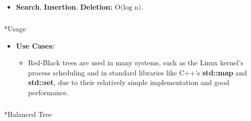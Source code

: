\documentclass[
  letterpaper,
  DIV=11,
  numbers=noendperiod]{scrreprt}
\makeatletter
\let\oldsubparagraph\subparagraph
\renewcommand{\subparagraph}{
    \@ifstar
      \xxxSubParagraphStar
      \xxxSubParagraphNoStar
  }
\newcommand{\xxxSubParagraphStar}[1]{\oldsubparagraph*{#1}\mbox{}}
\newcommand{\xxxSubParagraphNoStar}[1]{\oldsubparagraph{#1}\mbox{}}
\providecommand{\tightlist}{%
  \setlength{\itemsep}{0pt}\setlength{\parskip}{0pt}}
\makeatother
\begin{document}
\begin{tcolorbox}[enhanced jigsaw, colframe=quarto-callout-note-color-frame, toprule=.15mm, bottomrule=.15mm, rightrule=.15mm, colback=white, breakable, arc=.35mm, opacityback=0, left=2mm, leftrule=.75mm]
\begin{itemize}
  \begin{itemize}
  \tightlist
  \item
    \textbf{Search}, \textbf{Insertion}, \textbf{Deletion:}
    \(\text{O(log n)}\).
  \end{itemize}
\end{itemize}

\subparagraph*{Usage}\label{usage-25}

\begin{itemize}
\item
  \textbf{Use Cases:}

  \begin{itemize}
  \tightlist
  \item
    Red-Black trees are used in many systems, such as the Linux kernel's
    process scheduling and in standard libraries like C++'s
    \textbf{std::map} and \textbf{std::set}, due to their relatively
    simple implementation and good performance.
  \end{itemize}
\end{itemize}

\end{tcolorbox}

\subparagraph*{Balanced Tree}\label{balanced-tree}
\end{document}
